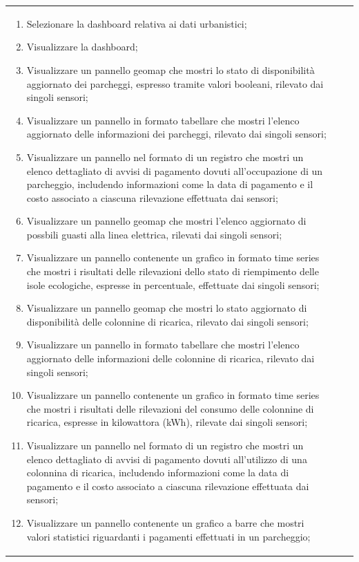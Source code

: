 \documentclass[8pt]{article}
\begin{document}
\begin{longtable}{|>{\centering}p{2cm}|>{\RaggedRight}m{12cm}|>{\centering\arraybackslash}p{2cm}|}
\begin{enumerate}
        \item Selezionare la dashboard relativa ai dati urbanistici;
        \item Visualizzare la dashboard;
        \item Visualizzare un pannello geomap che mostri lo stato di disponibilità aggiornato dei
            parcheggi, espresso tramite valori booleani, rilevato dai singoli sensori;
        \item Visualizzare un pannello in formato tabellare che mostri l'elenco aggiornato delle informazioni dei
            parcheggi, rilevato dai singoli sensori;
        \item Visualizzare un pannello nel formato di un registro che mostri un elenco dettagliato di
            avvisi di pagamento dovuti all'occupazione di un parcheggio, includendo informazioni come la data di pagamento e il costo
            associato a ciascuna rilevazione effettuata dai sensori;
        \item Visualizzare un pannello geomap che mostri l'elenco aggiornato di possbili guasti alla linea elettrica, rilevati dai singoli sensori;
        \item Visualizzare un pannello contenente un grafico in formato time series che mostri i
            risultati delle rilevazioni dello stato di riempimento delle isole ecologiche, espresse in percentuale, effettuate dai singoli sensori;
        \item Visualizzare un pannello geomap che mostri lo stato aggiornato di disponibilità delle colonnine di ricarica,
            rilevato dai singoli sensori;
        \item Visualizzare un pannello in formato tabellare che mostri l'elenco aggiornato delle informazioni delle colonnine di ricarica,
            rilevato dai singoli sensori;
        \item Visualizzare un pannello contenente un grafico in formato time series che mostri i
            risultati delle rilevazioni del consumo delle colonnine di ricarica, espresse in kilowattora (kWh), rilevate dai singoli sensori;
        \item Visualizzare un pannello nel formato di un registro che mostri un elenco dettagliato di
            avvisi di pagamento dovuti all'utilizzo di una colonnina di ricarica, includendo informazioni come la data di pagamento e il costo associato a ciascuna rilevazione effettuata dai sensori;
        \item Visualizzare un pannello contenente un grafico a barre che mostri valori statistici riguardanti i pagamenti effettuati in un parcheggio;

\end{enumerate}
\end{longtable}
\end{document}
